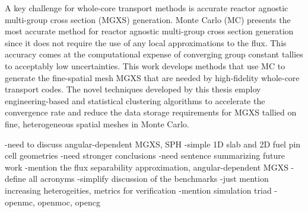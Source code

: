 \begin{abstractpage}

A key challenge for whole-core transport methods is accurate reactor agnostic multi-group cross section (MGXS) generation. Monte Carlo (MC) presents the most accurate method for reactor agnostic multi-group cross section generation since it does not require the use of any local approximations to the flux. This accuracy comes at the computational expense of converging group constant tallies to acceptably low uncertainties. This work develops methods that use MC to generate the fine-spatial mesh MGXS that are needed by high-fidelity whole-core transport codes. The novel techniques developed by this thesis employ engineering-based and statistical clustering algorithms to accelerate the convergence rate and reduce the data storage requirements for MGXS tallied on fine, heterogeneous spatial meshes in Monte Carlo.

-need to discuss angular-dependent MGXS, SPH
  -simple 1D slab and 2D fuel pin cell geometries
-need stronger conclusions
-need sentence summarizing future work
-mention the flux separability approximation, angular-dependent MGXS
-define all acronyms
-simplify discussion of the benchmarks
  -just mention increasing heterogeities, metrics for verification
-mention simulation triad - openmc, openmoc, opencg




\end{abstractpage}
